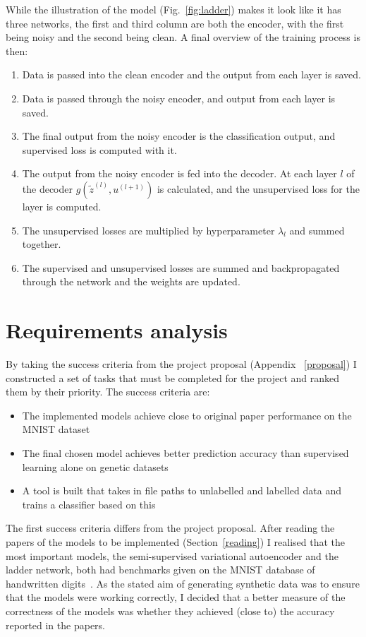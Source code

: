 \documentclass[12pt,a4paper,twoside,openright]{report}
\begin{document}
While the illustration of the model (Fig.~\ref{fig:ladder}) makes it look like it has three networks, the first and third column are both the encoder, with the first being 
noisy and the second being clean. A final overview of the training process is then:
\begin{enumerate}
  \item Data is passed into the clean encoder and the output from each layer is saved.
  \item Data is passed through the noisy encoder, and output from each layer is saved.
  \item The final output from the noisy encoder is the classification output, and supervised loss is computed with it.
  \item The output from the noisy encoder is fed into the decoder. At each layer $l$ of the decoder $g(\tilde{z}^{(l)}, u^{(l+1)})$ is calculated,
        and the unsupervised loss for the layer is computed.
  \item The unsupervised losses are multiplied by hyperparameter $\lambda_{l}$ and summed together.
  \item The supervised and unsupervised losses are summed and backpropagated through the network and the weights are updated.
\end{enumerate}  

\section{Requirements analysis}

By taking the success criteria from the project proposal (Appendix ~\ref{proposal}) I constructed a set of tasks that must be completed for the 
project and ranked them by their priority. The success criteria are:

\begin{itemize}
  \item The implemented models achieve close to original paper performance on the MNIST dataset 
  \item The final chosen model achieves better prediction accuracy than supervised learning alone on genetic datasets
  \item A tool is built that takes in file paths to unlabelled and labelled data and trains a classifier based on this
\end{itemize}

The first success criteria differs from the project proposal. After reading the papers of the models to be implemented (Section~\ref{reading}) I 
realised that the most important models, the semi-supervised variational autoencoder and the ladder network, both had benchmarks given on 
the MNIST database of handwritten digits~\cite{lecun-mnisthandwrittendigit-2010}. As the stated aim of generating synthetic data was to
ensure that the models were working correctly, I decided that a better measure of the correctness of the models was whether they
achieved (close to) the accuracy reported in the papers.
\end{document}
